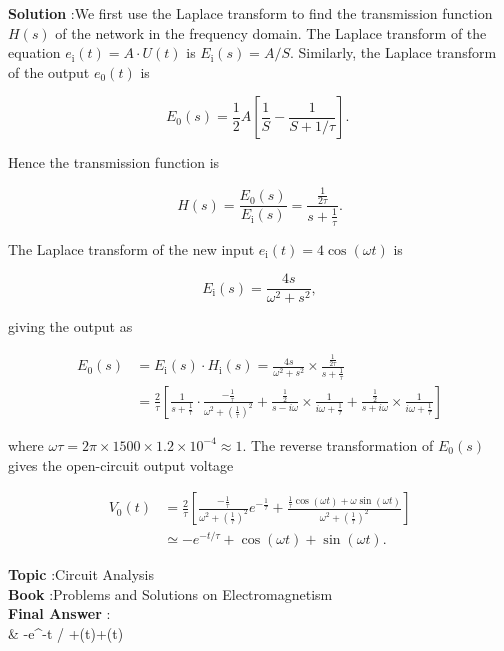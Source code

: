 \documentclass[10pt]{article}
\begin{document}
\textbf{Solution} :We first use the Laplace transform to find the transmission function $H(s)$ of the network in the frequency domain. The Laplace transform of the equation $e_{\mathrm{i}}(t)=A \cdot U(t)$ is $E_{\mathrm{i}}(s)=A / S$. Similarly, the Laplace transform of the output $e_{0}(t)$ is

$$
E_{0}(s)=\frac{1}{2} A\left[\frac{1}{S}-\frac{1}{S+1 / \tau}\right] \text {. }
$$

Hence the transmission function is

$$
H(s)=\frac{E_{0}(s)}{E_{\mathrm{i}}(s)}=\frac{\frac{1}{2 \tau}}{s+\frac{1}{\tau}} .
$$

The Laplace transform of the new input $e_{\mathrm{i}}(t)=4 \cos (\omega t)$ is

$$
E_{\mathrm{i}}(s)=\frac{4 s}{\omega^{2}+s^{2}},
$$

giving the output as

$$
\begin{aligned}
E_{0}(s) &=E_{\mathrm{i}}(s) \cdot H_{\mathrm{i}}(s)=\frac{4 s}{\omega^{2}+s^{2}} \times \frac{\frac{1}{2 \tau}}{s+\frac{1}{\tau}} \\
&=\frac{2}{\tau}\left[\frac{1}{s+\frac{1}{\tau}} \cdot \frac{-\frac{1}{\tau}}{\omega^{2}+\left(\frac{1}{\tau}\right)^{2}}+\frac{\frac{1}{2}}{s-i \omega} \times \frac{1}{i \omega+\frac{1}{\tau}}+\frac{\frac{1}{2}}{s+i \omega} \times \frac{1}{i \omega+\frac{1}{\tau}}\right]
\end{aligned}
$$

where $\omega \tau=2 \pi \times 1500 \times 1.2 \times 10^{-4} \approx 1$. The reverse transformation of $E_{0}(s)$ gives the open-circuit output voltage

$$
\begin{aligned}
V_{0}(t) &=\frac{2}{\tau}\left[\frac{-\frac{1}{\tau}}{\omega^{2}+\left(\frac{1}{\tau}\right)^{2}} e^{-\frac{1}{\tau}}+\frac{\frac{1}{\tau} \cos (\omega t)+\omega \sin (\omega t)}{\omega^{2}+\left(\frac{1}{\tau}\right)^{2}}\right] \\
& \simeq-e^{-t / \tau}+\cos (\omega t)+\sin (\omega t) .
\end{aligned}
$$

\textbf{Topic} :Circuit Analysis\\
\textbf{Book} :Problems and Solutions on Electromagnetism\\
\textbf{Final Answer} : \\
& \simeq-e^{-t / \tau}+\cos (\omega t)+\sin (\omega t)\\
\end{document}
